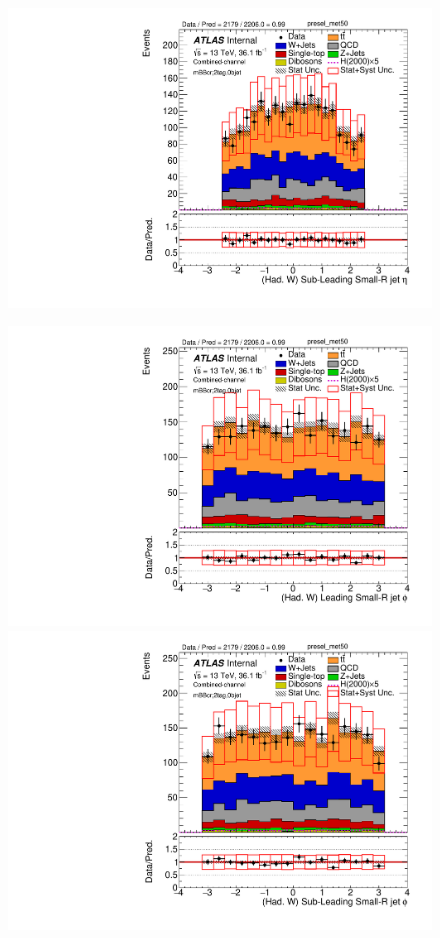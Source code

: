 \begin{figure}[!ht]
\begin{center}
\includegraphics[scale=0.33]{./figures/boosted/PlotsInMbbCR/DataMC_2tag_0bjet_mbbcr_lepton_presel_met50_LightJet2Eta}\\
\par\medskip
\includegraphics[scale=0.33]{./figures/boosted/PlotsInMbbCR/DataMC_2tag_0bjet_mbbcr_lepton_presel_met50_LightJet1Phi}
\includegraphics[scale=0.33]{./figures/boosted/PlotsInMbbCR/DataMC_2tag_0bjet_mbbcr_lepton_presel_met50_LightJet2Phi}\\

\end{center}
\end{figure}
